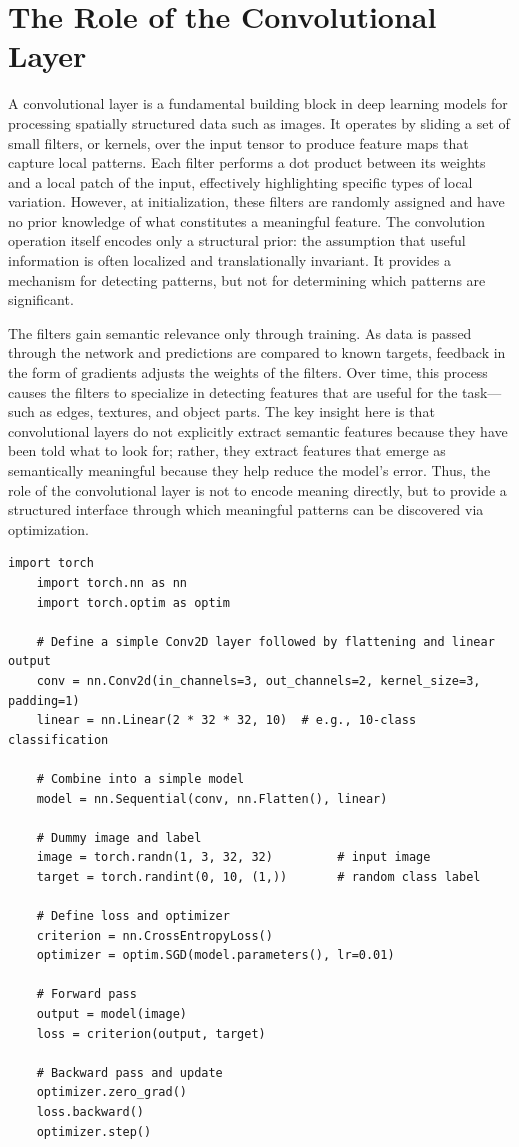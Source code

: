 \section{The Role of the Convolutional Layer}

A convolutional layer is a fundamental building block in deep learning models for processing spatially structured data such as images. It operates by sliding a set of small filters, or kernels, over the input tensor to produce feature maps that capture local patterns. Each filter performs a dot product between its weights and a local patch of the input, effectively highlighting specific types of local variation. However, at initialization, these filters are randomly assigned and have no prior knowledge of what constitutes a meaningful feature. The convolution operation itself encodes only a structural prior: the assumption that useful information is often localized and translationally invariant. It provides a mechanism for detecting patterns, but not for determining which patterns are significant.

The filters gain semantic relevance only through training. As data is passed through the network and predictions are compared to known targets, feedback in the form of gradients adjusts the weights of the filters. Over time, this process causes the filters to specialize in detecting features that are useful for the task—such as edges, textures, and object parts. The key insight here is that convolutional layers do not explicitly extract semantic features because they have been told what to look for; rather, they extract features that emerge as semantically meaningful because they help reduce the model’s error. Thus, the role of the convolutional layer is not to encode meaning directly, but to provide a structured interface through which meaningful patterns can be discovered via optimization.

\begin{lstlisting}[caption=Training a convolutional layer: random initialization and learning via gradient descent]
	import torch
	import torch.nn as nn
	import torch.optim as optim
	
	# Define a simple Conv2D layer followed by flattening and linear output
	conv = nn.Conv2d(in_channels=3, out_channels=2, kernel_size=3, padding=1)
	linear = nn.Linear(2 * 32 * 32, 10)  # e.g., 10-class classification
	
	# Combine into a simple model
	model = nn.Sequential(conv, nn.Flatten(), linear)
	
	# Dummy image and label
	image = torch.randn(1, 3, 32, 32)         # input image
	target = torch.randint(0, 10, (1,))       # random class label
	
	# Define loss and optimizer
	criterion = nn.CrossEntropyLoss()
	optimizer = optim.SGD(model.parameters(), lr=0.01)
	
	# Forward pass
	output = model(image)
	loss = criterion(output, target)
	
	# Backward pass and update
	optimizer.zero_grad()
	loss.backward()
	optimizer.step()
\end{lstlisting}

